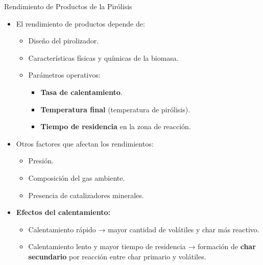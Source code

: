 \documentclass[../../main.tex]{subfiles}
\begin{document}
\begin{frame}{Rendimiento de Productos de la Pirólisis}
\footnotesize
\begin{itemize}
  \item El rendimiento de productos depende de:
  \begin{itemize}
    \item Diseño del pirolizador.
    \item Características físicas y químicas de la biomasa.
    \item Parámetros operativos:
    \begin{itemize}
      \item \textbf{Tasa de calentamiento}.
      \item \textbf{Temperatura final} (temperatura de pirólisis).
      \item \textbf{Tiempo de residencia} en la zona de reacción.
    \end{itemize}
  \end{itemize}
  
  \item Otros factores que afectan los rendimientos:
  \begin{itemize}
    \item Presión.
    \item Composición del gas ambiente.
    \item Presencia de catalizadores minerales.
  \end{itemize}

  \item \textbf{Efectos del calentamiento:}
  \begin{itemize}
    \item Calentamiento rápido → mayor cantidad de volátiles y char más reactivo.
    \item Calentamiento lento y mayor tiempo de residencia → formación de \textbf{char secundario} por reacción entre char primario y volátiles.
  \end{itemize}
\end{itemize}
\end{frame}
\end{document}
